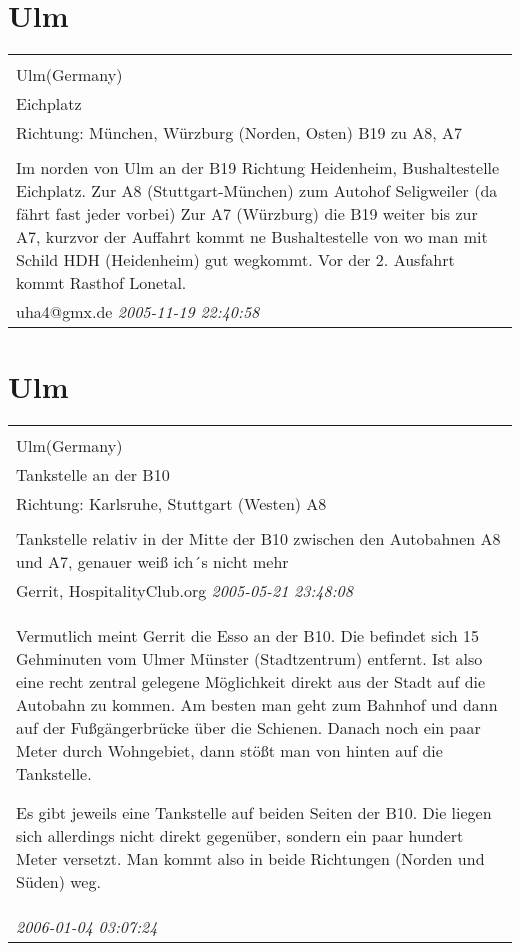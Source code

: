 \documentclass[a4paper,12pt]{article}
\begin{document}
\section{Ulm}
\begin{tabular}{|p{13cm}|}
\hline\\
Ulm(Germany)\\
Eichplatz\\
Richtung: München, Würzburg (Norden, Osten) B19 zu A8, A7 \\
\hline\\
Im norden von Ulm an der B19 Richtung Heidenheim, Bushaltestelle Eichplatz.
Zur A8 (Stuttgart-München) zum Autohof Seligweiler (da fährt fast jeder vorbei)
Zur A7 (Würzburg) die B19 weiter bis zur A7, kurzvor der Auffahrt kommt ne Bushaltestelle von wo man mit Schild HDH (Heidenheim) gut wegkommt. Vor der 2. Ausfahrt kommt Rasthof Lonetal. \\
uha4@gmx.de \textit{ 2005-11-19 22:40:58 }\\\hline
\end{tabular}


\section{Ulm}
\begin{tabular}{|p{13cm}|}
\hline\\
Ulm(Germany)\\
Tankstelle an der B10\\
Richtung: Karlsruhe, Stuttgart (Westen) A8 \\
\hline\\
Tankstelle relativ in der Mitte der B10 zwischen den Autobahnen A8 und A7, genauer weiß ich´s nicht mehr \\
Gerrit, HospitalityClub.org \textit{ 2005-05-21 23:48:08 }\\\hline Vermutlich meint Gerrit die Esso an der B10. Die befindet sich 15 Gehminuten vom Ulmer Münster (Stadtzentrum) entfernt. Ist also eine recht zentral gelegene Möglichkeit direkt aus der Stadt auf die Autobahn zu kommen.
Am besten man geht zum Bahnhof und dann auf der Fußgängerbrücke über die Schienen. Danach noch ein paar Meter durch Wohngebiet, dann stößt man von hinten auf die Tankstelle.

Es gibt jeweils eine Tankstelle auf beiden Seiten der B10. Die liegen sich allerdings nicht direkt gegenüber, sondern ein paar hundert Meter versetzt. Man kommt also in beide Richtungen (Norden und Süden) weg. \\
\textit{ 2006-01-04 03:07:24 }\\\hline
\end{tabular}
\end{document}
